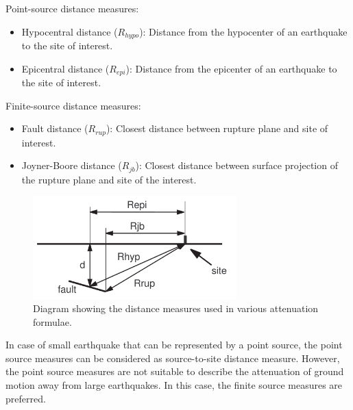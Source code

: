Point-source distance measures:
\begin{itemize}
\item Hypocentral distance ($R_{hypo}$): Distance from the hypocenter of an earthquake to the site of interest.
\item Epicentral distance ($R_{epi}$): Distance from the epicenter of an earthquake to the site of interest.
\end{itemize}

Finite-source distance measures:
\begin{itemize}
\item Fault distance ($R_{rup}$): Closest distance between rupture plane and site of interest.
\item Joyner-Boore distance ($R_{jb}$): Closest distance between surface projection of the rupture plane and site of the interest.
\end{itemize}
\begin{figure}[htp]
 \centering {}
  
  
\includegraphics[width=0.7\textwidth]{diags/fig-hattn-distance.pdf}
\caption{Diagram showing the distance measures used in various
  attenuation formulae.}
  \label{fig:attn-distances}
\end{figure}
In case of small earthquake that can be represented by a point
source, the point source measures can be considered as
source-to-site distance measure. However, the point source measures
are not suitable to describe the attenuation of ground motion away
from large earthquakes. In this case, the finite source measures are
preferred.

